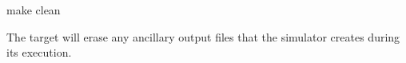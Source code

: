 \begin{CommandLine}
make clean
\end{CommandLine}

The  target will erase any ancillary output files that the
simulator creates during its execution.

\begin{comment}

\subsection{Working with Source Code}


The simulator link feature can make it easy to work with filesystem roots.  One
example of this is the Smokey directory in Blaze:  the recent reorganization
closely mimics the layout on the DUT.  To use Blaze with the simulator, one of
the following is required:

- Sequence is platform agnostic and files are stored under
	Blaze/Smokey/SEQUENCE/Main.plist
	Blaze/Smokey/SEQUENCE/Main.lua
- Sequence is platform-specific and files are stored under
	Blaze/Smokey/SEQUENCE/PLATFORM/Main.plist
	Blaze/Smokey/SEQUENCE/PLATFORM/Main.lua
- Sequence is platform-specific and files are stored under
	Blaze/Smokey/SEQUENCE/PLATFORM.plist
	Blaze/Smokey/SEQUENCE/PLATFORM.lua

where SEQUENCE is the specific sequence name (e.g. Wildfire) and PLATFORM is
the platform name according to EFI (e.g. N78, K93, N41).  For platform-specific
sequences, the simulator will detect the DUT platform and choose the
corresponding files.

Blaze is intended only for source code, but Smokey expects output files (e.g.
Smokey.log and PDCA.plist) to exist beforehand.  To aid in generating these
files, a Makefile has been checked into Blaze as Blaze/Smokey/Makefile.  To use
it, go to the Blaze/Smokey directory and run the command

	make files

Conversely, to remove the output files, run the command

	make clean

Using the simulator will require the binary be accessible from the Blaze/Smokey
directory.  This can be done either by copying the binary into Blaze/Smokey or
using the full path when calling the binary.


\end{comment}
